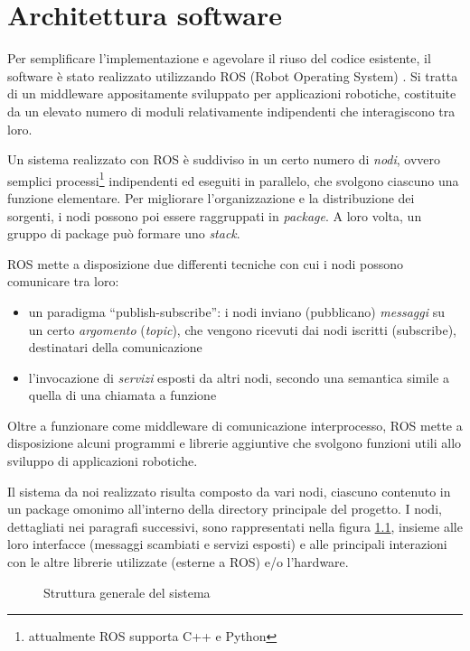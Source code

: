 \chapter{Architettura software}
\label{cap:architetturasw}

Per semplificare l'implementazione e agevolare il riuso del codice esistente, il software è stato realizzato utilizzando ROS (Robot Operating System) \cite{rosweb}. Si tratta di un middleware appositamente sviluppato per applicazioni robotiche, costituite da un elevato numero di moduli relativamente indipendenti che interagiscono tra loro.

Un sistema realizzato con ROS è suddiviso in un certo numero di \emph{nodi}, ovvero semplici processi\footnote{attualmente ROS supporta C++ e Python} indipendenti ed eseguiti in parallelo, che svolgono ciascuno una funzione elementare. Per migliorare l'organizzazione e la distribuzione dei sorgenti, i nodi possono poi essere raggruppati in \emph{package}. A loro volta, un gruppo di package può formare uno \emph{stack}.

ROS mette a disposizione due differenti tecniche con cui i nodi possono comunicare tra loro:
\begin{itemize}
 \item un paradigma ``publish-subscribe'': i nodi inviano (pubblicano) \emph{messaggi} su un certo \emph{argomento} (\emph{topic}), che vengono ricevuti dai nodi iscritti (subscribe), destinatari della comunicazione
 \item l'invocazione di \emph{servizi} esposti da altri nodi, secondo una semantica simile a quella di una chiamata a funzione
\end{itemize}

Oltre a funzionare come middleware di comunicazione interprocesso, ROS mette a disposizione alcuni programmi e librerie aggiuntive che svolgono funzioni utili allo sviluppo di applicazioni robotiche.

Il sistema da noi realizzato risulta composto da vari nodi, ciascuno contenuto in un package omonimo all'interno della directory principale del progetto. I nodi, dettagliati nei paragrafi successivi, sono rappresentati nella figura \ref{fig:schemanodi}, insieme alle loro interfacce (messaggi scambiati e servizi esposti) e alle principali interazioni con le altre librerie utilizzate (esterne a ROS) e/o l'hardware.

\begin{figure}[h]

\caption{Struttura generale del sistema} 
\label{fig:schemanodi}
\end{figure}

